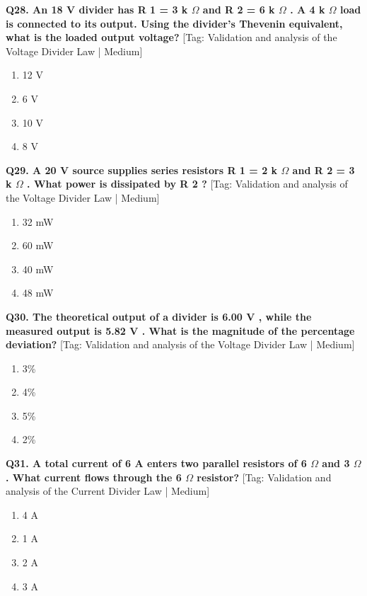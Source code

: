 \noindent\textbf{Q28. An 18 V divider has R 1 = 3 k $\Omega$ and R 2 = 6 k $\Omega$ . A 4 k $\Omega$ load is connected to its output. Using the divider's Thevenin equivalent, what is the loaded output voltage?} \hfill [Tag: Validation and analysis of the Voltage Divider Law | Medium]
\begin{enumerate}[label=(\alph*),topsep=2pt,itemsep=1pt,partopsep=0pt,parsep=0pt]
    \item {12 V}
    \item {6 V}
    \item {10 V}
    \item {8 V}
\end{enumerate}
\vspace{2mm}

\noindent\textbf{Q29. A 20 V source supplies series resistors R 1 = 2 k $\Omega$ and R 2 = 3 k $\Omega$ . What power is dissipated by R 2 ?} \hfill [Tag: Validation and analysis of the Voltage Divider Law | Medium]
\begin{enumerate}[label=(\alph*),topsep=2pt,itemsep=1pt,partopsep=0pt,parsep=0pt]
    \item {32 mW}
    \item {60 mW}
    \item {40 mW}
    \item {48 mW}
\end{enumerate}
\vspace{2mm}

\noindent\textbf{Q30. The theoretical output of a divider is 6.00 V , while the measured output is 5.82 V . What is the magnitude of the percentage deviation?} \hfill [Tag: Validation and analysis of the Voltage Divider Law | Medium]
\begin{enumerate}[label=(\alph*),topsep=2pt,itemsep=1pt,partopsep=0pt,parsep=0pt]
    \item {3\%}
    \item {4\%}
    \item {5\%}
    \item {2\%}
\end{enumerate}
\vspace{2mm}

\noindent\textbf{Q31. A total current of 6 A enters two parallel resistors of 6 $\Omega$ and 3 $\Omega$ . What current flows through the 6 $\Omega$ resistor?} \hfill [Tag: Validation and analysis of the Current Divider Law | Medium]
\begin{enumerate}[label=(\alph*),topsep=2pt,itemsep=1pt,partopsep=0pt,parsep=0pt]
    \item {4 A}
    \item {1 A}
    \item {2 A}
    \item {3 A}
\end{enumerate}
\vspace{2mm}

